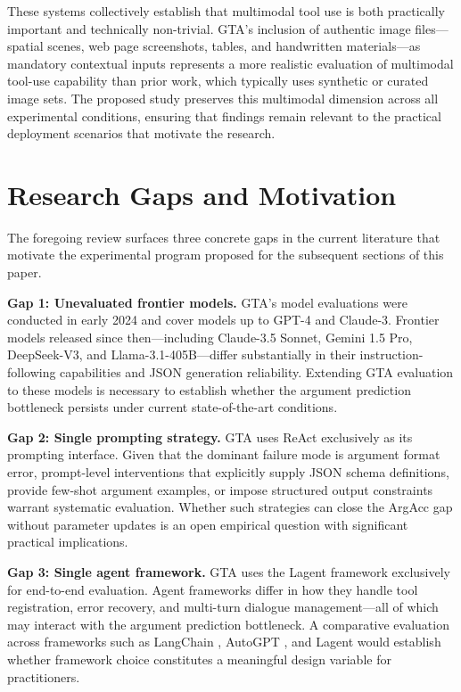 \documentclass[conference]{IEEEtran}
\begin{document}
These systems collectively establish that multimodal tool use is both practically important and technically non-trivial. GTA's inclusion of authentic image files---spatial scenes, web page screenshots, tables, and handwritten materials---as mandatory contextual inputs represents a more realistic evaluation of multimodal tool-use capability than prior work, which typically uses synthetic or curated image sets. The proposed study preserves this multimodal dimension across all experimental conditions, ensuring that findings remain relevant to the practical deployment scenarios that motivate the research.

\section{Research Gaps and Motivation}

The foregoing review surfaces three concrete gaps in the current literature that motivate the experimental program proposed for the subsequent sections of this paper.

\textbf{Gap 1: Unevaluated frontier models.} GTA's model evaluations were conducted in early 2024 and cover models up to GPT-4 and Claude-3. Frontier models released since then---including Claude-3.5 Sonnet, Gemini 1.5 Pro, DeepSeek-V3, and Llama-3.1-405B---differ substantially in their instruction-following capabilities and JSON generation reliability. Extending GTA evaluation to these models is necessary to establish whether the argument prediction bottleneck persists under current state-of-the-art conditions.

\textbf{Gap 2: Single prompting strategy.} GTA uses ReAct exclusively as its prompting interface. Given that the dominant failure mode is argument format error, prompt-level interventions that explicitly supply JSON schema definitions, provide few-shot argument examples, or impose structured output constraints warrant systematic evaluation. Whether such strategies can close the ArgAcc gap without parameter updates is an open empirical question with significant practical implications.

\textbf{Gap 3: Single agent framework.} GTA uses the Lagent framework exclusively for end-to-end evaluation. Agent frameworks differ in how they handle tool registration, error recovery, and multi-turn dialogue management---all of which may interact with the argument prediction bottleneck. A comparative evaluation across frameworks such as LangChain \cite{chase2022langchain}, AutoGPT \cite{gravitas2023autogpt}, and Lagent would establish whether framework choice constitutes a meaningful design variable for practitioners.
\end{document}
